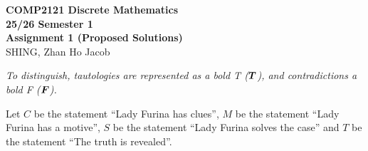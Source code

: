 \documentclass[answers]{exam}
\begin{document}
\begin{center}
    \textbf
    {\Large{COMP2121 Discrete Mathematics} \\
    \large{25/26 Semester 1} \\
    \large{Assignment 1 (Proposed Solutions)}}\\
    SHING, Zhan Ho Jacob 
\end{center}

\textit{
    To distinguish, tautologies are represented as a bold T ($\bm{T}$),
    and contradictions a bold F ($\bm{F}$).
}

\begin{questions}
    
    \question Let $C$ be the statement ``Lady Furina has clues'', $M$ be the statement ``Lady Furina has a motive'', $S$ be
    the statement ``Lady Furina solves the case'' and $T$ be the statement ``The truth is revealed''.

\end{questions}
\end{document}
